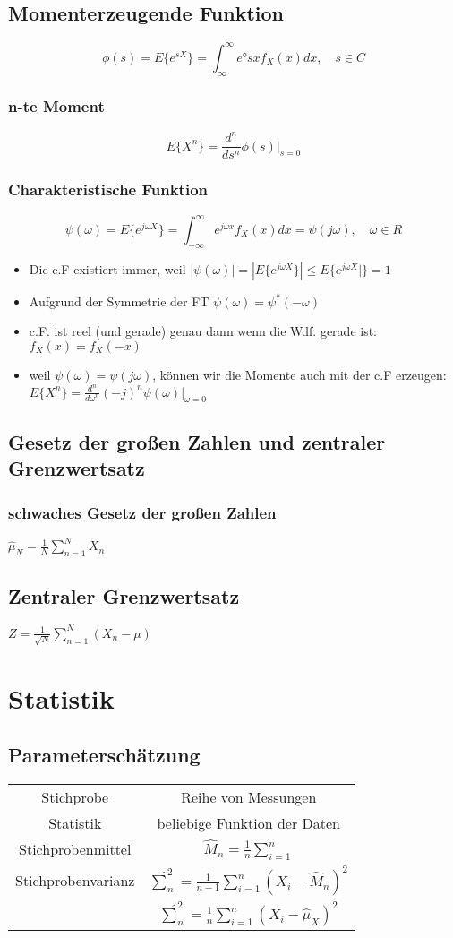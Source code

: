 \documentclass{article}
\begin{document}
\subsection{Momenterzeugende Funktion}
$$\phi(s) = E\{e^{sX}\} = \int_{\infty}^{\infty}e°{sx} f_X(x) dx,\quad s \in C $$
\subsubsection{n-te Moment}
$$E\{X^n\} = \frac{d^n}{ds^n} \phi(s)|_{s=0}$$
\subsubsection{Charakteristische Funktion}
$$\psi(\omega) = E\{e^{j\omega X}\} = \int_{-\infty}^{\infty} e^{j\omega x}f_X(x) dx =  \psi(j\omega), \quad \omega \in R$$
\begin {itemize}
\item  Die c.F existiert immer, weil $|\psi(\omega)| = |E\{ e^{j\omega X}\}| \le E\{e^{j\omega X}|\} = 1$
\item Aufgrund der Symmetrie der FT $\psi(\omega) = \psi^*(-\omega)$
\item c.F. ist reel (und gerade) genau dann wenn die Wdf. gerade ist: $f_X(x) = f_X(-x)$
\item weil $\psi(\omega) = \psi(j\omega)$, können wir die Momente auch mit der c.F erzeugen: $E\{X^n\} = \frac{d^n}{d\omega^n}(-j)^n\psi(\omega)|_{\omega = 0}$
\end{itemize}
\subsection{Gesetz der gro\ss en Zahlen und zentraler Grenzwertsatz}
\subsubsection{schwaches Gesetz der gro\ss en Zahlen}
$\hat{\mu}_N = \frac{1}{N} \sum_{n = 1}^N X_n$
\subsection{Zentraler Grenzwertsatz}
$Z = \frac{1}{\sqrt{N}}\sum_{n = 1}^N(X_n -\mu)$

\section {Statistik}
\subsection{Parameterschätzung}
\begin{tabular}{c c }
Stichprobe& Reihe von Messungen \\
Statistik & beliebige Funktion der Daten \\
Stichprobenmittel & $\hat{M}_n = \frac{1}{n} \sum_{i=1}^n$\\
Stichprobenvarianz & $\hat{\sum}_n^2 = \frac{1}{n-1} \sum_{i = 1}^n(X_i-\hat{M}_n)^2$ \\
		& $\hat{\sum}_n^2 = \frac{1}{n} \sum_{i = 1}^n(X_i-\hat{\mu}_X)^2$
\end{tabular}
\end{document}
